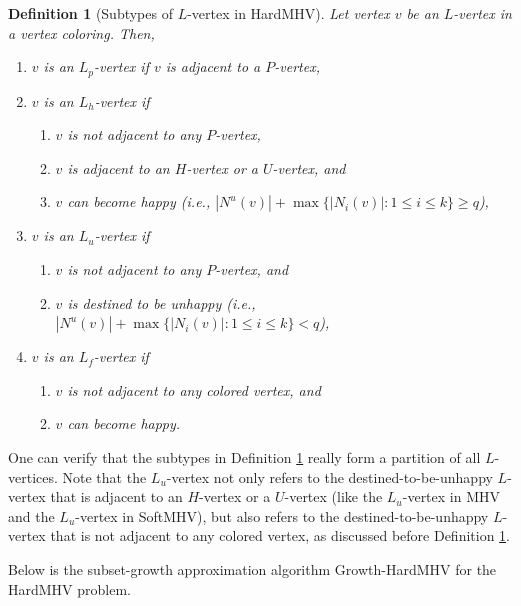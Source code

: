 \documentclass[11pt]{article}
\newtheorem{definition}{Definition}[section]
\begin{document}
\begin{definition}[Subtypes of $L$-vertex in HardMHV]
\label{def - subtypes of L-vertex - HardMHV}
Let vertex $v$ be an $L$-vertex in a vertex coloring. Then,
\begin{enumerate}
\item $v$ is an $L_p$-vertex if $v$ is adjacent to a $P$-vertex,

\item $v$ is an $L_{h}$-vertex if
\begin{enumerate}
\item $v$ is not adjacent to any $P$-vertex,
\item $v$ is adjacent to an $H$-vertex or a $U$-vertex, and
\item $v$ can become happy (i.e.,
$|N^u(v)| + \max \{|N_i(v)| \colon 1 \leq i \leq k \} \geq q$),
\end{enumerate}

\item $v$ is an $L_{u}$-vertex if
\begin{enumerate}
\item $v$ is not adjacent to any $P$-vertex, and
\item $v$ is destined to be unhappy (i.e.,
$|N^u(v)| + \max \{|N_i(v)| \colon 1 \leq i \leq k \} < q$),
\end{enumerate}

\item $v$ is an $L_f$-vertex if
\begin{enumerate}
\item $v$ is not adjacent to any colored vertex, and
\item $v$ can become happy.
\end{enumerate}
\end{enumerate}
\end{definition}

One can verify that the subtypes in
Definition \ref{def - subtypes of L-vertex - HardMHV}
really form a partition of all $L$-vertices. Note that the $L_{u}$-vertex
not only refers to the destined-to-be-unhappy $L$-vertex that is adjacent
to an $H$-vertex or a $U$-vertex (like the $L_{u}$-vertex in MHV and
the $L_{u}$-vertex in SoftMHV), but also refers to the
destined-to-be-unhappy $L$-vertex that is not adjacent to any colored vertex,
as discussed before Definition \ref{def - subtypes of L-vertex - HardMHV}.


Below is the subset-growth approximation algorithm {\sc Growth-HardMHV}
for the HardMHV problem.
\end{document}
